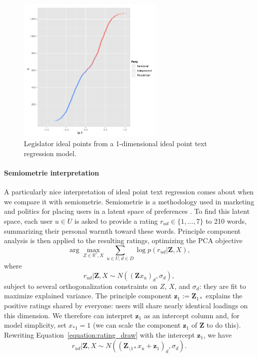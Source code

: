 \begin{figure}
  \includegraphics[width=200pt]{figures/legis_src_ip_regression_user_ips.pdf}
  \caption{Legislator ideal points from a 1-dimensional ideal point text regression model.}
  \label{figure:ip_text_regression_ideal_points}
\end{figure}

\paragraph{Semiometrie interpretation}
A particularly nice interpretation of ideal point text regression
comes about when we compare it with semiometrie.  Semiometrie is a
methodology used in marketing and politics for placing users in a
latent space of preferences \cite{camillo:2005}.  To find this latent space, each user $u
\in U$ is asked to provide a rating $r_{ud} \in \{ 1, \ldots, 7 \}$ to
210 words, summarizing their personal warmth toward these words.
Principle component analysis is then applied to the resulting ratings,
optimizing the PCA objective
 \[ \arg \max_{Z \in \mathbb{R}^r, X } \sum_{u \in U, d \in D} \log p(r_{ud} | \bm Z, X),
 \]
where \begin{equation}
\label{equation:rating_draw}
r_{ud} | \bm Z, X \sim N((\bm Z x_u)_d, \sigma_d),
 \end{equation}
 subject to several orthogonalization constraints on $Z$, $X$, and
 $\sigma_d$: they are fit to maximize explained variance.  The
 principle component $\bm z_1 := \bm Z_{1*}$ explains the positive
 ratings shared by everyone: users will share nearly identical
 loadings on this dimension.  We therefore can interpret $\bm z_1$ as an
 intercept column and, for model simplicity, set $x_{*1} = 1$ (we can
 scale the component $\bm z_1$ of $\bm Z$ to do this).  Rewriting
 Equation~\ref{equation:rating_draw} with the intercept $\bm z_1$, we have \[
 r_{ud} | \bm Z, X \sim N((\bm Z_{\setminus1*} x_u + \bm z_1)_d,
 \sigma_d).
 \]

